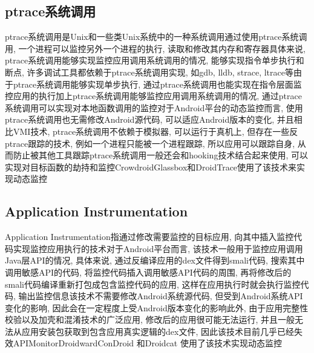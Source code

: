 \subsection{ptrace系统调用}
ptrace系统调用是Unix和一些类Unix系统中的一种系统调用\juhao 通过使用ptrace系统调用, 一个进程可以监控另外一个进程的执行, 读取和修改其内存和寄存器\juhao 具体来说, ptrace系统调用能够实现监控应用调用系统调用的情况, 能够实现指令单步执行和断点, 许多调试工具都依赖于ptrace系统调用实现, 如gdb, lldb, strace, ltrace等\juhao 由于ptrace系统调用能够实现单步执行, 通过ptrace系统调用也能实现在指令层面监控应用的执行\juhao 加上ptrace系统调用能够监控应用调用系统调用的情况, 通过ptrace系统调用可以实现对本地函数调用的监控\juhao 对于Android平台的动态监控而言, 使用ptrace系统调用也无需修改Android源代码, 可以适应Android版本的变化, 并且相比VMI技术, ptrace系统调用不依赖于模拟器, 可以运行于真机上, 但存在一些反ptrace跟踪的技术, 例如一个进程只能被一个进程跟踪, 所以应用可以跟踪自身, 从而防止被其他工具跟踪\juhao ptrace系统调用一般还会和hooking技术结合起来使用, 可以实现对目标函数的劫持和监控\juhao Crowdroid\dunhao Glassbox和DroidTrace使用了该技术来实现动态监控\juhao

\subsection{Application Instrumentation}
Application Instrumentation指通过修改需要监控的目标应用, 向其中插入监控代码实现监控应用执行的技术\juhao 对于Android平台而言, 该技术一般用于监控应用调用Java层API的情况, 具体来说, 通过反编译应用的dex文件得到smali代码, 搜索其中调用敏感API的代码, 将监控代码插入调用敏感API代码的周围, 再将修改后的smali代码编译重新打包成包含监控代码的应用, 这样在应用执行时就会执行监控代码, 输出监控信息\juhao 该技术不需要修改Android系统源代码, 但受到Android系统API变化的影响, 因此会在一定程度上受Android版本变化的影响\juhao 此外, 由于应用完整性校验以及加壳和混淆技术的广泛应用, 修改后的应用很可能无法运行, 并且一般无法从应用安装包获取到包含应用真实逻辑的dex文件, 因此该技术目前几乎已经失效\juhao APIMonitor\dunhao Droidward\dunhao ConDroid 和Droidcat 使用了该技术实现动态监控\juhao

